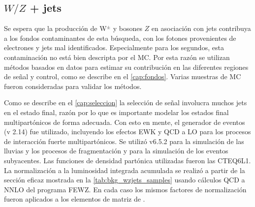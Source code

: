 \begin{table}[!htbp]
\begin{tabular}{lccccc}
  \end{tabular}
  \label{tab:bkg_wzgamma_samples}
\end{table}


\subsection{$W/Z$ + jets}
\label{mc_wzjets}

Se espera que la producción de W$^{\pm}$ y bosones $Z$ en asociación con jets
contribuya a los fondos contaminantes de esta búsqueda, con los fotones provenientes de electrones y jets
mal identificados. Especialmente para los segundos, esta contaminación no está
bien descripta por el MC. Por esta razón se utilizan métodos basados en datos
para estimar su contribución en las diferentes regiones de señal y control, como
se describe en el \cref{cap:fondos}. Varias muestras de MC
fueron consideradas para validar los métodos.

Como se describe en el \cref{cap:seleccion} la selección de señal involucra
muchos jets en el estado final, razón por lo que es importante modelar los estados final
multipartónicos de forma adecuada. Con esto en mente, el generador de eventos
{\alpgen} (v 2.14) fue utilizado, incluyendo los efectos EWK y QCD a LO para los
procesos de interacción fuerte multipartónicos. Se utilizó {\herwig} v6.5.2 para la simulación de las lluvias y los procesos de
fragmentación y {\jimmy} para la simulación de los eventos subyacentes. Las
funciones de densidad partónica utilizadas fueron las CTEQ6L1. La normalización
a la luminosidad integrada acumulada se realizó a partir de la sección eficaz
mostrada en la \cref{tab:bkg_wzjets_samples} usando cálculos QCD a NNLO del
programa FEWZ\cite{Anastasiou:2003ds}. En cada caso los mismos factores de
normalización fueron aplicados a los elementos de matriz de {\alpgen}.

